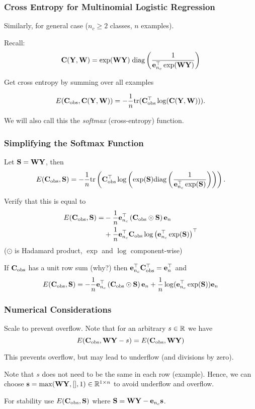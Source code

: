 \documentclass[12pt,fleqn,handout]{beamer}
\begin{document}
\begin{frame}
	\frametitle{Cross Entropy for Multinomial Logistic Regression}
	
	Similarly, for general case ($n_c\geq2$ classes, $n$ examples). 
	
	Recall: 
	$${\bf C}({\bf Y},{\bf W})  =   \exp({\bf W} {\bf Y})\; {\rm diag} \left({\frac 1 {{\bf e}_{n_c}^\top\exp({\bf W} {\bf Y})}}  \right)  $$

\bigskip

Get cross entropy by summing over all examples

$$ E({\bf C}_{\rm obs},{\bf C}({\bf Y},{\bf W})) = -\frac{1}{n}{\rm tr}( {\bf C}_{\rm obs}^\top\log({\bf C}({\bf Y},{\bf W})) ). $$

We will also call this the \emph{softmax} (cross-entropy) function.


\end{frame}


\begin{frame}\frametitle{Simplifying the Softmax Function}

Let ${\bf S} = {\bf W} {\bf Y}$, then 
$$ 
E({\bf C}_{\rm obs},{\bf S}) = -\frac{1}{n}{\rm tr}\left({\bf C}_{\rm obs}^{\top} \log\left({\exp({\bf S})}{\rm diag}\left(\frac{1}{{\bf e}_{n_c}^\top \exp({\bf S}) }\right) \right)\right). 
$$
\pause

Verify that this is equal to
\begin{align*}
	 E({\bf C}_{\rm obs},{\bf S}) = & -\frac{1}{n}{\bf e}_{n_c}^{\top} \left( {\bf C}_{\rm obs} \odot {\bf S}\right) {\bf e}_{n} \\
	 & + \frac{1}{n} {\bf e}_{n_c}^\top {\bf C}_{\rm obs}\log\left({\bf e}_{n_c}^\top\exp({\bf S})\right)^\top
\end{align*}
($\odot$ is Hadamard product, $\exp$ and $\log$ component-wise)
\bigskip
\pause


If ${\bf C}_{\rm obs}$ has a unit row sum (why?) then $ {\bf e}_{n_c}^\top {\bf C}_{\rm obs}^\top = {\bf e}_n^\top$
and 
$$ E({\bf C}_{\rm obs},{\bf S}) = -\frac{1}{n}{\bf e}_{n_c}^{\top} \left( {\bf C}_{\rm obs} \odot {\bf S}\right) {\bf e}_{n} 
+ \frac{1}{n}\log({\bf e}_{n_c}^\top\exp({\bf S})){\bf e}_{n} $$


\end{frame}



\begin{frame}\frametitle{Numerical Considerations}

Scale to prevent overflow. Note that for an arbitrary $s\in\mathbb{R}$ we have
$$ E({\bf C}_{\rm obs},{\bf W}{\bf Y}-s) = E({\bf C}_{\rm obs},{\bf W}{\bf Y}) $$

This prevents overflow, but may lead to underflow (and divisions by zero).

\bigskip
\pause

Note that $s$ does not need to be the same in each row (example). Hence, 
we can choose ${\bf s} = \max({\bf W}{\bf Y},[],1 ) \in \mathbb{R}^{1\times n}$ to avoid underflow and overflow.

\bigskip
\begin{center}
For stability use $E({\bf C}_{\rm obs},{\bf S})$ where $ {\bf S} = {\bf W} {\bf Y} - {\bf e}_{n_c} {\bf s}$.
\end{center}
\end{frame}
\end{document}
